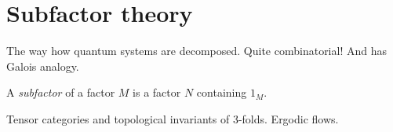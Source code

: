 \documentclass{../../large}
\begin{document}
\part{Subfactor theory}






The way how quantum systems are decomposed.
Quite combinatorial!
And has Galois analogy.

\begin{prb}
A \emph{subfactor} of a factor $M$ is a factor $N$ containing $1_M$.
\end{prb}

Tensor categories and topological invariants of 3-folds.
Ergodic flows.
\end{document}
